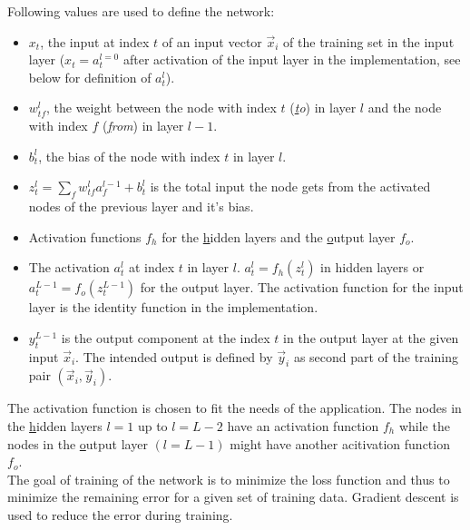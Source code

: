 Following values are used to define the network:
\begin{itemize}
    \item $x_t$, the input at index $t$ of an input vector $\vec{x}_i$ of the training set
    in the input layer ($x_t = a^{l=0}_t$ after activation of the input layer in the
    implementation, see below for definition of $a^l_t$).

    \item $w^l_{tf}$, the weight between the node with index $t$ (\emph{\underline{t}o})
    in layer $l$ and the node with index $f$ (\emph{\underline{f}rom}) in layer $l-1$.

    \item $b^l_t$, the bias of the node with index $t$ in layer $l$.
    
    \item $z^l_t = \sum_{f}{w^l_{tf} a^{l-1}_f} + b^l_t$ is the total input the node gets
    from the activated nodes of the previous layer and it's bias.
    
    \item Activation functions $f_h$ for the \underline{h}idden layers and the
    \underline{o}utput layer $f_o$.
    
    \item The activation $a^l_t$ at index $t$ in layer $l$. $a^l_t = f_h(z^l_t)$ in hidden
    layers or $a^{L-1}_t = f_o(z^{L-1}_t)$ for the output layer. The activation function
    for the input layer is the identity function in the implementation.

    \item $y^{L-1}_t$ is the output component at the index $t$ in the output layer at the
    given input $\vec{x}_i$. The intended output is defined by $\vec{y}_i$ as second part
    of the training pair $(\vec{x}_i, \vec{y}_i)$.
\end{itemize}

The activation function is chosen to fit the needs of the application. The nodes in the
\underline{h}idden layers $l=1$ up to $l=L-2$ have an activation function $f_h$ while the
nodes in the \underline{o}utput layer $(l=L-1)$ might have another acitivation function
$f_o$. \\

The goal of training of the network is to minimize the loss function and thus to minimize
the remaining error for a given set of training data. Gradient descent is used to reduce
the error during training.\\

